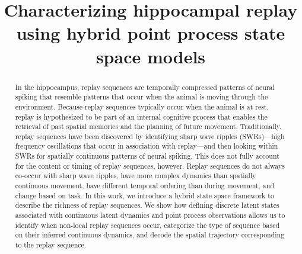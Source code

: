 \documentclass[conference]{IEEEtran}
\begin{document}
\title{Characterizing hippocampal replay using hybrid point process state space models}

\author{
\and
{}
\and
{}

}

\maketitle

\begin{abstract}
In the hippocampus, replay sequences are temporally compressed patterns of neural spiking that resemble patterns that occur when the animal is moving through the environment. Because replay sequences typically occur when the animal is at rest, replay is hypothesized to be part of an internal cognitive process that enables the retrieval of past spatial memories and the planning of future movement. Traditionally, replay sequences have been discovered by identifying sharp wave ripples (SWRs)---high frequency oscillations that occur in association with replay---and then looking within SWRs for spatially continuous patterns of neural spiking. This does not fully account for the content or timing of replay sequences, however. Replay sequences do not always co-occur with sharp wave ripples, have more complex dynamics than spatially continuous movement, have different temporal ordering than during movement, and change based on task. In this work, we introduce a hybrid state space framework to describe the richness of replay sequences. We show how defining discrete latent states associated with continuous latent dynamics and point process observations allows us to identify when non-local replay sequences occur, categorize the type of sequence based on their inferred continuous dynamics, and decode the spatial trajectory corresponding to the replay sequence.

\end{abstract}
\end{document}
